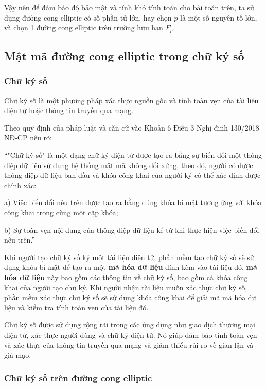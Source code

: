 Vậy nên để đảm bảo độ bảo mật và tính khó tính toán cho bài toán trên,
ta sử dụng đường cong elliptic có số phần tử lớn, hay chọn $p$ là một
số nguyên tố lớn, và chọn 1 đường cong elliptic trên trường hữu hạn $F_p$. \cite{elliptic}

\subsection{Mật mã đường cong elliptic trong chữ ký số}
\subsubsection{Chữ ký số} 

Chữ ký số là một phương pháp xác thực nguồn gốc và tính toàn vẹn của tài liệu điện tử hoặc thông tin truyền qua mạng. 

Theo quy định của pháp luật và căn cứ vào Khoản 6 Điều 3 Nghị định 130/2018 NĐ-CP nêu rõ: 

“"Chữ ký số" là một dạng chữ ký điện tử được tạo ra bằng sự biến đổi một thông điệp dữ liệu sử dụng hệ thống mật mã không đối xứng, theo đó, người có được thông điệp dữ liệu ban đầu và khóa công khai của người ký có thể xác định được chính xác:

a) Việc biến đổi nêu trên được tạo ra bằng đúng khóa bí mật tương ứng với khóa công khai trong cùng một cặp khóa;

b) Sự toàn vẹn nội dung của thông điệp dữ liệu kể từ khi thực hiện việc biến đổi nêu trên.”

Khi người tạo chữ ký số ký một tài liệu điện tử, phần mềm tạo chữ ký số sẽ sử dụng khóa bí mật để tạo ra một \textbf{mã hóa dữ liệu} đính kèm vào tài liệu đó. \textbf{mã hóa dữ liệu}  này bao gồm các thông tin về chữ ký số, bao gồm cả khóa công khai của người tạo chữ ký. Khi người nhận tài liệu muốn xác thực chữ ký số, phần mềm xác thực chữ ký số sẽ sử dụng khóa công khai để giải mã mã hóa dữ liệu và kiểm tra tính toàn vẹn của tài liệu đó.

Chữ ký số được sử dụng rộng rãi trong các ứng dụng như giao dịch thương mại điện tử, xác thực người dùng và chữ ký điện tử. Nó giúp đảm bảo tính toàn vẹn và xác thực của thông tin truyền qua mạng và giảm thiểu rủi ro về gian lận và giả mạo.

\subsubsection{Chữ ký số trên đường cong elliptic}

